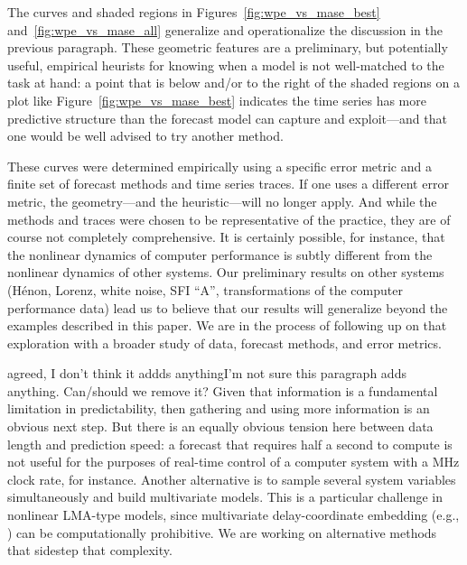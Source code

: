 The curves and shaded regions in Figures~\ref{fig:wpe_vs_mase_best}
and~\ref{fig:wpe_vs_mase_all} generalize and operationalize the
discussion in the previous paragraph.  These geometric features are a
preliminary, but potentially useful, empirical heurists for knowing
when a model is not well-matched to the task at hand: a point that is
below and/or to the right of the shaded regions on a plot like
Figure~\ref{fig:wpe_vs_mase_best} indicates the time series has more
predictive structure than the forecast model can capture and
exploit---and that one would be well advised to try another method.

These curves were determined empirically using a specific error metric
and a finite set of forecast methods and time series traces.  If one
uses a different error metric, the geometry---and the heuristic---will
no longer apply.  And while the methods and traces were chosen to be
representative of the practice, they are of course not completely
comprehensive.  It is certainly possible, for instance, that the
nonlinear dynamics of computer performance is subtly different from
the nonlinear dynamics of other systems.  Our preliminary results on
other systems (H\'enon, Lorenz, white noise, SFI ``A'', transformations
of the computer performance data) lead us to believe that our results
will generalize beyond the examples described in this paper.  We are
in the process of following up on that exploration with a broader
study of data, forecast methods, and error metrics.

{\color{blue}agreed, I don't think it addds anything}\alert{I'm not sure this paragraph adds anything.  Can/should we
  remove it?  Given that information is a fundamental limitation in
  predictability, then gathering and using more information is an
  obvious next step.  But there is an equally obvious tension here
  between data length and prediction speed: a forecast that requires
  half a second to compute is not useful for the purposes of real-time
  control of a computer system with a MHz clock rate, for instance.
  Another alternative is to sample several system variables
  simultaneously and build multivariate models.  This is a particular
  challenge in nonlinear LMA-type models, since multivariate
  delay-coordinate embedding (e.g.,
  \cite{cao-multivariate-embedding,deyle-sugihara2011}) can be
  computationally prohibitive.  We are working on alternative methods
  that sidestep that complexity.}


